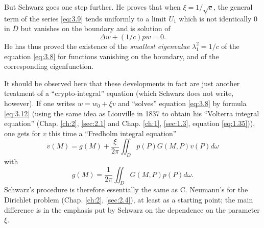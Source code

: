 \documentclass[12pt,a4paper,leqno,twoside]{extbook}
\begin{document}
But Schwarz goes one step further. He proves that when \(\xi = 1/\sqrt{c}\), the general term of the series \eqref{eq:3.9} tends uniformly to a limit \(U_1\) which is not identically 0 in \(\overline{D}\) but vanishes on the boundary and is solution of
\begin{equation}
    \label{eq:3.18}
    \Delta w + (1/c) pw = 0.
\end{equation}
He has thus proved the existence of the \emph{smallest eigenvalue} \(\lambda_1^2 = 1/c\) of the equation \eqref{eq:3.8} for functions vanishing on the boundary, and of the corresponding eigenfunction.

It should be observed here that these developments in fact are just another treatment of a ``crypto-integral'' equation (which Schwarz does not write, however). If one writes \(w = w_0 + \xi v\) and ``solves'' equation \eqref{eq:3.8} by formula \eqref{eq:3.12} (using the same idea as Liouville in 1837 to obtain his ``Volterra integral equation'' (Chap. \ref{ch:2}, \ref{sec:2.1} and Chap. \ref{ch:1}, \ref{sec:1.3}, equation \eqref{eq:1.35})), one gets for \(v\) this time a ``Fredholm integral equation''
\begin{equation}
    \label{eq:3.19}
    v(M) = g(M) + \frac{\xi}{2\pi} \iint_D p(P) G(M, P) v(P) d\omega
\end{equation}
with
\[
    g(M) = \frac{1}{2\pi} \iint_D G(M, P) p(P) d\omega.
\]
Schwarz's procedure is therefore essentially the same as C. Neumann's for the Dirichlet problem (Chap. \ref{ch:2}, \ref{sec:2.4}), at least as a starting point; the main difference is in the emphasis put by Schwarz on the dependence on the parameter \(\xi\).
\end{document}
